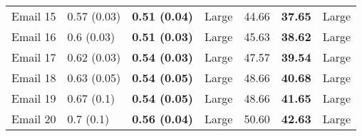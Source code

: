 \begin{tabular}{lllllll}
 Email 15 &       0.57 (0.03) &  \textbf{0.51 (0.04)} &       Large &                   44.66 &           \textbf{37.65} &       Large \\
 Email 16 &        0.6 (0.03) &  \textbf{0.51 (0.03)} &       Large &                   45.63 &           \textbf{38.62} &       Large \\
 Email 17 &       0.62 (0.03) &  \textbf{0.54 (0.03)} &       Large &                   47.57 &           \textbf{39.54} &       Large \\
 Email 18 &       0.63 (0.05) &  \textbf{0.54 (0.05)} &       Large &                   48.66 &           \textbf{40.68} &       Large \\
 Email 19 &        0.67 (0.1) &  \textbf{0.54 (0.05)} &       Large &                   48.66 &           \textbf{41.65} &       Large \\
 Email 20 &         0.7 (0.1) &  \textbf{0.56 (0.04)} &       Large &                   50.60 &           \textbf{42.63} &       Large \\
\bottomrule
\end{tabular}
